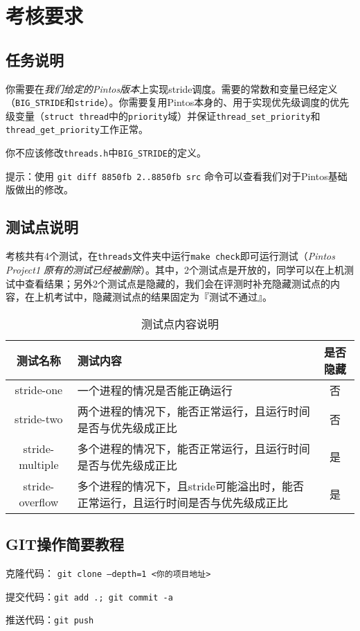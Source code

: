 \documentclass{ctexart}
\begin{document}
\section{考核要求}
\subsection{任务说明}
你需要在\emph{我们给定的Pintos版本}上实现stride调度。需要的常数和变量已经定义（\texttt{BIG\_STRIDE}和\texttt{stride}）。你需要复用Pintos本身的、用于实现优先级调度的优先级变量（\texttt{struct thread}中的\texttt{priority}域）并保证\texttt{thread\_set\allowbreak\_priority}和\texttt{thread\_get\_priority}工作正常。

你不应该修改\texttt{threads.h}中\texttt{BIG\_STRIDE}的定义。

提示：使用 \texttt{git diff 8850fb~2..8850fb src} 命令可以查看我们对于Pintos基础版做出的修改。
\subsection{测试点说明}
考核共有4个测试，在\texttt{threads}文件夹中运行\texttt{make check}即可运行测试（\emph{Pintos Project1 原有的测试已经被删除}）。其中，2个测试点是开放的，同学可以在上机测试中查看结果；另外2个测试点是隐藏的，我们会在评测时补充隐藏测试点的内容，在上机考试中，隐藏测试点的结果固定为『测试不通过』。

\begin{table}[h]
    \caption{测试点内容说明}
    \centering
    \begin{tabularx}{\textwidth}{cXc} 
    \toprule
    测试名称            & 测试内容   & 是否隐藏  \\
    \midrule
    stride-one      & 一个进程的情况是否能正确运行                              & 否     \\
    stride-two      & 两个进程的情况下，能否正常运行，且运行时间是否与优先级成正比              & 否     \\
    stride-multiple & 多个进程的情况下，能否正常运行，且运行时间是否与优先级成正比              & 是     \\
    stride-overflow & 多个进程的情况下，且stride可能溢出时，能否正常运行，且运行时间是否与优先级成正比 & 是     \\
    \bottomrule
    \end{tabularx}
\end{table}

\begin{appendix}
\section{GIT操作简要教程}
克隆代码： \texttt{git clone --depth=1 <你的项目地址>}

提交代码：\texttt{git add .; git commit -a}

推送代码：\texttt{git push}
\end{appendix}
\end{document}
